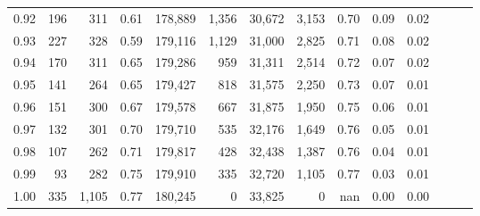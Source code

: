 \begin{tabular}{rrrrrrrrrrrrrr}
0.92 &    196 &    311 &  0.61 &  178,889 &    1,356 &  30,672 &   3,153 &  0.70 &  0.09 &      0.02 \\
0.93 &    227 &    328 &  0.59 &  179,116 &    1,129 &  31,000 &   2,825 &  0.71 &  0.08 &      0.02 \\
0.94 &    170 &    311 &  0.65 &  179,286 &      959 &  31,311 &   2,514 &  0.72 &  0.07 &      0.02 \\
0.95 &    141 &    264 &  0.65 &  179,427 &      818 &  31,575 &   2,250 &  0.73 &  0.07 &      0.01 \\
0.96 &    151 &    300 &  0.67 &  179,578 &      667 &  31,875 &   1,950 &  0.75 &  0.06 &      0.01 \\
0.97 &    132 &    301 &  0.70 &  179,710 &      535 &  32,176 &   1,649 &  0.76 &  0.05 &      0.01 \\
0.98 &    107 &    262 &  0.71 &  179,817 &      428 &  32,438 &   1,387 &  0.76 &  0.04 &      0.01 \\
0.99 &     93 &    282 &  0.75 &  179,910 &      335 &  32,720 &   1,105 &  0.77 &  0.03 &      0.01 \\
1.00 &    335 &  1,105 &  0.77 &  180,245 &        0 &  33,825 &       0 &   nan &  0.00 &      0.00 \\
\bottomrule
\end{tabular}
